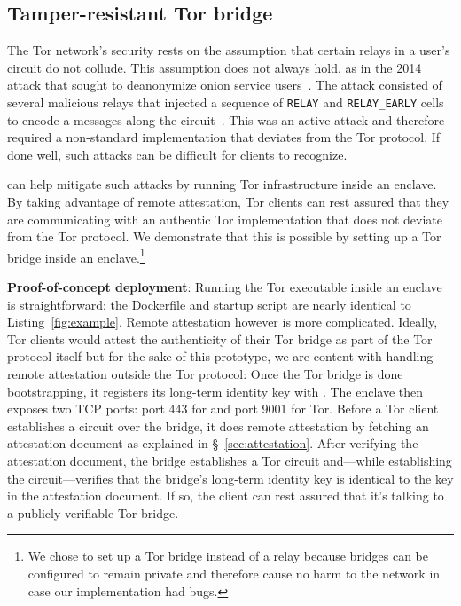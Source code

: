 \subsection{Tamper-resistant Tor bridge}
\label{sec:tor-bridge}

The Tor network's security rests on the assumption that certain relays in a
user's circuit do not collude.  This assumption does not always hold, as in the
2014 attack that sought to deanonymize onion service
users~\cite{Dingledine2015a}.  The attack consisted of several malicious relays
that injected a sequence of \texttt{RELAY} and \texttt{RELAY\_EARLY} cells to
encode a messages along the circuit~\cite[\S~5.6]{tor-spec}.  This was an active
attack and therefore required a non-standard implementation that deviates from
the Tor protocol.  If done well, such attacks can be difficult for clients to
recognize.

\Tool{} can help mitigate such attacks by running Tor infrastructure inside an
enclave.  By taking advantage of remote attestation, Tor clients can rest
assured that they are communicating with an authentic Tor implementation that
does not deviate from the Tor protocol.  We demonstrate that this is possible
by setting up a Tor bridge inside an enclave.\footnote{We chose to set up a Tor
bridge instead of a relay because bridges can be configured to remain private
and therefore cause no harm to the network in case our implementation had
bugs.}

\textbf{Proof-of-concept deployment}:
Running the Tor executable inside an enclave is straightforward: the Dockerfile
and startup script are nearly identical to Listing~\ref{fig:example}.  Remote
attestation however is more complicated.  Ideally, Tor clients would attest the
authenticity of their Tor bridge as part of the Tor protocol itself but for the
sake of this prototype, we are content with handling remote attestation outside
the Tor protocol: Once the Tor bridge is done bootstrapping, it registers
its long-term identity key with \tool{}.  The enclave then exposes two TCP
ports: port 443 for \tool{} and port 9001 for Tor.  Before a Tor client
establishes a circuit over the bridge, it does remote attestation by fetching
an attestation document as explained in \S~\ref{sec:attestation}.  After
verifying the attestation document, the bridge establishes a Tor circuit
and---while establishing the circuit---verifies that the bridge's long-term
identity key is identical to the key in the attestation document.  If so, the
client can rest assured that it's talking to a publicly verifiable Tor bridge.

